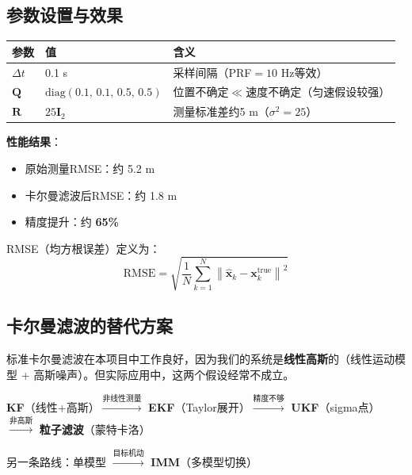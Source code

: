 \documentclass[12pt, a4paper]{article}
\newcommand{\mat}[1]{\boldsymbol{#1}}
\begin{document}
\subsection{参数设置与效果}

\begin{table}[H]
\centering
\begin{tabular}{lll}
\toprule
参数 & 值 & 含义 \\
\midrule
$\Delta t$ & 0.1 s & 采样间隔（PRF$=10$ Hz等效）\\
$\mat{Q}$ & $\text{diag}(0.1,\,0.1,\,0.5,\,0.5)$ & 位置不确定$\ll$速度不确定（匀速假设较强）\\
$\mat{R}$ & $25\mat{I}_2$ & 测量标准差约5 m（$\sigma^2=25$）\\
\bottomrule
\end{tabular}
\end{table}

\textbf{性能结果}：
\begin{itemize}
  \item 原始测量RMSE：约 5.2 m
  \item 卡尔曼滤波后RMSE：约 1.8 m
  \item 精度提升：约 \textbf{65\%}
\end{itemize}

RMSE（均方根误差）定义为：
\begin{equation}
\text{RMSE} = \sqrt{\frac{1}{N}\sum_{k=1}^{N}\left\|\hat{\mat{x}}_k - \mat{x}_k^\text{true}\right\|^2}
\end{equation}

\subsection{卡尔曼滤波的替代方案}

标准卡尔曼滤波在本项目中工作良好，因为我们的系统是\textbf{线性高斯}的（线性运动模型 + 高斯噪声）。但实际应用中，这两个假设经常不成立。

\begin{keybox}[跟踪滤波算法进化路线]
\begin{center}
\textbf{KF}（线性+高斯）$\xrightarrow{\text{非线性测量}}$ \textbf{EKF}（Taylor展开）$\xrightarrow{\text{精度不够}}$ \textbf{UKF}（sigma点）$\xrightarrow{\text{非高斯}}$ \textbf{粒子滤波}（蒙特卡洛）

\medskip
另一条路线：单模型 $\xrightarrow{\text{目标机动}}$ \textbf{IMM}（多模型切换）
\end{center}
\end{keybox}
\end{document}
